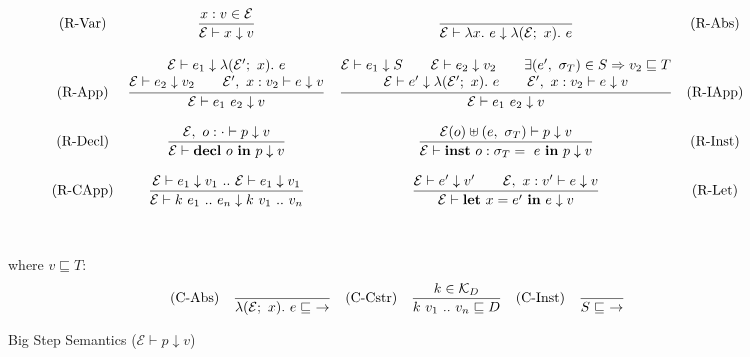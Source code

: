 \documentclass[runningheads]{llncs}
\begin{document}
\begin{figure}$$
  \begin{array}{c c c c} 
    \text{(R-Var)}
    &
    \displaystyle
    \frac{x: v  \in \mathcal{E}}
         {\mathcal{E} \vdash x \downarrow v}
    &
    \displaystyle
    \frac{}
    {\mathcal{E} \vdash \lambda x. \ e \downarrow \lambda (\mathcal{E}; \ x). \ e}
    &
    \text{(R-Abs)}
    \\\\
    \text{(R-App)}
    &
    \displaystyle
    \frac{ \begin{matrix}
      \mathcal{E} \vdash e_1 \downarrow \lambda (\mathcal{E^\prime}; \ x). \ e \\
      \mathcal{E} \vdash e_2 \downarrow v_2 \quad \quad \mathcal{E}^\prime, \ x : v_2 \vdash e \downarrow v
    \end{matrix}}
         {\mathcal{E} \vdash e_1 \ e_2 \downarrow v}
    &
    \displaystyle
    \frac{ \begin{matrix}
      \mathcal{E} \vdash e_1 \downarrow S \quad \quad \mathcal{E} \vdash e_2 \downarrow v_2 \quad\quad \exists(e^\prime, \ \sigma_T) \in S  \Rightarrow v_2 \sqsubseteq T \\
      \mathcal{E} \vdash e^\prime \downarrow \lambda (\mathcal{E^\prime}; \ x). \ e  \quad \quad \mathcal{E}^\prime, \ x : v_2 \vdash e \downarrow v
    \end{matrix}}
         {\mathcal{E} \vdash e_1 \ e_2 \downarrow v}
    &
    \text{(R-IApp)}
    \\\\
    \text{(R-Decl)}
    &
    \displaystyle
    \frac{\mathcal{E}, \ o : \cdot \vdash p \downarrow v}
         {\mathcal{E} \vdash \textbf{decl} \ o \ \textbf{in} \ p \downarrow v}
    &
    \displaystyle
    \frac{\mathcal{E}(o) \uplus (e, \ \sigma_T) \vdash p \downarrow v}
         {\mathcal{E} \vdash \textbf{inst} \ o : \sigma_T = \ e \ \textbf{in} \ p \downarrow v}
    &
    \text{(R-Inst)}
    \\\\
    \text{(R-CApp)}
    &
    \displaystyle
    \frac{\mathcal{E} \vdash e_1 \downarrow v_1 \ .. \ \mathcal{E} \vdash e_1 \downarrow v_1}
         {\mathcal{E} \vdash k \ e_1 \ .. \ e_n \downarrow k \ v_1 \ .. \ v_n}
    &
    \displaystyle
    \frac{\mathcal{E} \vdash e^\prime \downarrow v^\prime \quad\quad \mathcal{E},\ x : v^\prime \vdash e \downarrow v}
         {\mathcal{E} \vdash \textbf{let} \ x = e^\prime \ \textbf{in} \ e \downarrow v}
    &
    \text{(R-Let)}
  \end{array}$$
  \\\\
  where $v \sqsubseteq T:$
  $$\begin{array}{c c c c c c} 
    \text{(C-Abs)}
    &
    \displaystyle
    \frac{}
         {\lambda (\mathcal{E}; \ x). \ e \sqsubseteq \ \rightarrow}
    &
    \text{(C-Cstr)}
    &
    \displaystyle
    \frac{k \in \mathcal{K}_D}
    {k \ v_1 \ .. \ v_n \sqsubseteq D}
    &
    \text{(C-Inst)}
    &
    \displaystyle
    \frac{}
    {S \sqsubseteq \ \rightarrow}
  \end{array}$$
  \caption{Big Step Semantics ($\mathcal{E} \vdash p \downarrow v$)}
\end{figure}
\end{document}
